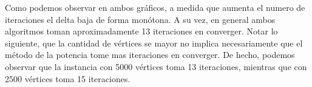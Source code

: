 Como podemos observar en ambos gráficos, a medida que aumenta el numero de iteraciones el delta baja de forma monótona. A su vez, en general ambos algoritmos toman aproximadamente 13 iteraciones en converger. Notar lo siguiente, que la cantidad de vértices se mayor no implica necesariamente que el método de la potencia tome mas iteraciones en converger. De hecho, podemos observar que la instancia con 5000 vértices toma 13 iteraciones, mientras que con 2500 vértices toma 15 iteraciones.